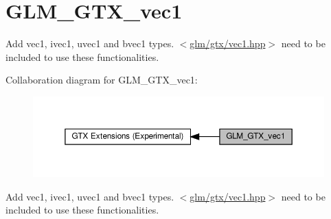 \hypertarget{group__gtx__vec1}{}\section{G\+L\+M\+\_\+\+G\+T\+X\+\_\+vec1}
\label{group__gtx__vec1}


Add vec1, ivec1, uvec1 and bvec1 types. $<$\hyperlink{vec1_8hpp}{glm/gtx/vec1.\+hpp}$>$ need to be included to use these functionalities.  


Collaboration diagram for G\+L\+M\+\_\+\+G\+T\+X\+\_\+vec1\+:\nopagebreak
\begin{figure}[H]
\begin{center}
\leavevmode
\includegraphics[width=350pt]{group__gtx__vec1}
\end{center}
\end{figure}
Add vec1, ivec1, uvec1 and bvec1 types. $<$\hyperlink{vec1_8hpp}{glm/gtx/vec1.\+hpp}$>$ need to be included to use these functionalities. 

